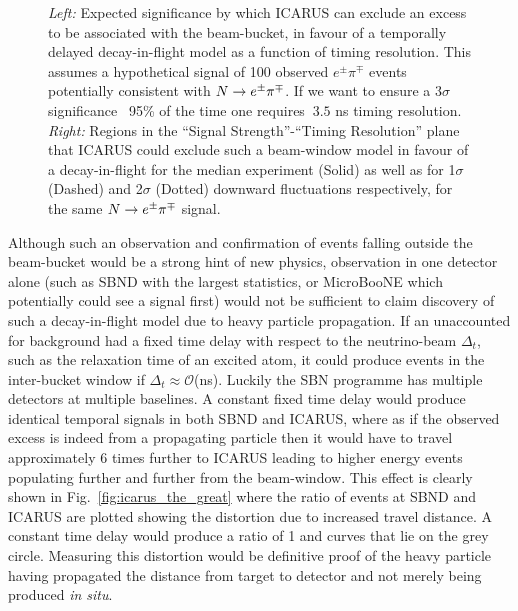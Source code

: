 \documentclass[11pt, a4paper]{article}
\newcommand{\reffig}[1]{Fig.~\ref{#1}}
\def\ster{\ensuremath N}
\begin{document}
\begin{figure}[t]
\begin{subfigure}[t]{0.5\textwidth}
\end{subfigure}
\caption{\label{fig:hockey}
\emph{Left:} Expected significance by which ICARUS can exclude an excess to be associated with the beam-bucket, in favour of a temporally delayed decay-in-flight model as a function of timing resolution. This assumes a hypothetical signal of 100 observed $e^\pm \pi^\mp$ events potentially consistent with $\ster \rightarrow e^\pm \pi^\mp$. If we want to ensure a $3\sigma$ significance ~95\% of the time one requires $~3.5$ ns timing resolution. \emph{Right:} Regions in the ``Signal Strength''-``Timing Resolution'' plane that ICARUS could exclude such a beam-window model in favour of a decay-in-flight for the median experiment (Solid) as well as for 1$\sigma$ (Dashed) and 2$\sigma$ (Dotted) downward fluctuations respectively, for the same $\ster \rightarrow e^\pm \pi^\mp$ signal.}

\end{figure}

Although such an observation and confirmation of events falling outside the beam-bucket
would be a strong hint of new physics, observation in one detector alone (such as
SBND with the largest statistics, or MicroBooNE which potentially could see a signal first)
would not be sufficient to claim discovery of such a decay-in-flight model due to
heavy particle propagation. If an unaccounted for background had a fixed time
delay with respect to the neutrino-beam $\Delta_t$, such as the relaxation time
of an excited atom, it could produce events in the inter-bucket window
if $\Delta_t \approx \mathcal{O}$(ns). Luckily the SBN programme has multiple
detectors at multiple baselines. A constant fixed time delay would produce
identical temporal signals in both SBND and ICARUS, where as if the observed
excess is indeed from a propagating particle then it would have to travel
approximately 6 times further to ICARUS leading to higher energy events populating further
and further from the beam-window. This effect is clearly shown in
\reffig{fig:icarus_the_great} where the ratio of events at SBND and ICARUS are
plotted showing the distortion due to increased travel distance. A constant
time delay would produce a ratio of 1 and curves that lie on the grey circle.
Measuring this distortion would be definitive proof of the heavy particle
having propagated the distance from target to detector and not merely being
produced \emph{in situ}.
\end{document}
